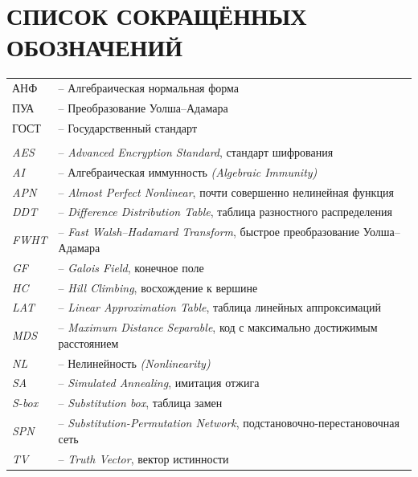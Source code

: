 \section*{СПИСОК СОКРАЩЁННЫХ ОБОЗНАЧЕНИЙ}
{
\setlength{\parindent}{0pt}
\begin{flushleft}
\begin{tabular}{@{}ll}
АНФ   & -- Алгебраическая нормальная форма \\
ПУА   & -- Преобразование Уолша--Адамара \\
ГОСТ  & -- Государственный стандарт \\
\mbox{} \\
\textit{AES}   & -- \textit{Advanced Encryption Standard}, стандарт шифрования \\
\textit{AI}    & -- Алгебраическая иммунность \textit{(Algebraic Immunity)} \\
\textit{APN}   & -- \textit{Almost Perfect Nonlinear}, почти совершенно нелинейная функция \\
\textit{DDT}   & -- \textit{Difference Distribution Table}, таблица разностного распределения \\
\textit{FWHT}  & -- \textit{Fast Walsh--Hadamard Transform}, быстрое преобразование Уолша--Адамара \\
\textit{GF}    & -- \textit{Galois Field}, конечное поле \\
\textit{HC}    & -- \textit{Hill Climbing}, восхождение к вершине \\
\textit{LAT}   & -- \textit{Linear Approximation Table}, таблица линейных аппроксимаций \\
\textit{MDS}   & -- \textit{Maximum Distance Separable}, код с максимально достижимым расстоянием \\
\textit{NL}    & -- Нелинейность \textit{(Nonlinearity)} \\
\textit{SA}    & -- \textit{Simulated Annealing}, имитация отжига \\
\textit{S-box} & -- \textit{Substitution box}, таблица замен \\
\textit{SPN}   & -- \textit{Substitution-Permutation Network}, подстановочно-перестановочная сеть \\
\textit{TV}    & -- \textit{Truth Vector}, вектор истинности \\
\end{tabular}
\end{flushleft}
}

